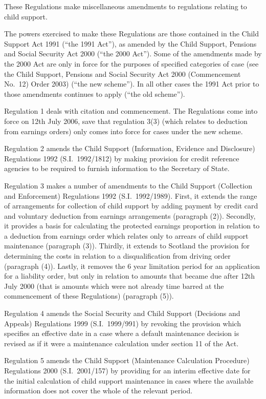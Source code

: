 \documentclass[12pt,a4paper]{article}
\begin{document}
These Regulations make miscellaneous amendments to regulations relating to child support.

The powers exercised to make these Regulations are those contained in the Child Support Act 1991 (“the 1991 Act”), as amended by the Child Support, Pensions and Social Security Act 2000 (“the 2000 Act”). Some of the amendments made by the 2000 Act are only in force for the purposes of specified categories of case (see the Child Support, Pensions and Social Security Act 2000 (Commencement No.\ 12) Order 2003) (“the new scheme”). In all other cases the 1991 Act prior to those amendments continues to apply (“the old scheme”).

Regulation 1 deals with citation and commencement. The Regulations come into force on 12th July 2006, save that regulation 3(3) (which relates to deduction from earnings orders) only comes into force for cases under the new scheme.

Regulation 2 amends the Child Support (Information, Evidence and Disclosure) Regulations 1992 (S.I.\ 1992/1812) by making provision for credit reference agencies to be required to furnish information to the Secretary of State.

Regulation 3 makes a number of amendments to the Child Support (Collection and Enforcement) Regulations 1992 (S.I.\ 1992/1989). First, it extends the range of arrangements for collection of child support by adding payment by credit card and voluntary deduction from earnings arrangements (paragraph (2)). Secondly, it provides a basis for calculating the protected earnings proportion in relation to a deduction from earnings order which relates only to arrears of child support maintenance (paragraph (3)). Thirdly, it extends to Scotland the provision for determining the costs in relation to a disqualification from driving order (paragraph (4)). Lastly, it removes the 6 year limitation period for an application for a liability order, but only in relation to amounts that became due after 12th July 2000 (that is amounts which were not already time barred at the commencement of these Regulations) (paragraph (5)).

Regulation 4 amends the Social Security and Child Support (Decisions and Appeals) Regulations 1999 (S.I.\ 1999/991) by revoking the provision which specifies an effective date in a case where a default maintenance decision is revised as if it were a maintenance calculation under section 11 of the Act.

Regulation 5 amends the Child Support (Maintenance Calculation Procedure) Regulations 2000 (S.I.\ 2001/157) by providing for an interim effective date for the initial calculation of child support maintenance in cases where the available information does not cover the whole of the relevant period.
\end{document}
